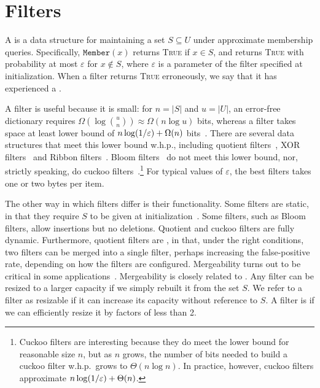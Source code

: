 
\section{Filters}

A  is a data structure for maintaining a set $S\subseteq U$ under approximate membership queries.  Specifically, $\texttt{Member}(x)$ returns \textsc{True} if $x\in S$, and returns \textsc{True} with probability at most $\varepsilon$ for $x\notin S$, where $\varepsilon$ is a parameter of the filter specified at initialization.  When a filter returns \textsc{True} erroneously, we say that it has experienced a .

A filter is useful because it is small: for $n= |S|$ and $u = |U|$, an error-free dictionary requires $\Omega(\log {u\choose n})
\approx \Omega(n \log u)$ bits, whereas a filter  takes space at least  lower bound of $n\log (1/\varepsilon) + \Omega(n)$
bits~\cite{CarterFG78}.  There are several data structures that meet this lower bound w.h.p., including quotient filters~\cite{Cleary84,PaghPaRa05,DillingerM09,BenderFaJo12a,PandeyBJP17,PandeyCDBFJ21}, XOR
filters~\cite{GrafLe20} and Ribbon filters~\cite{DillingerW21}.  Bloom filters~\cite{Bloom70} do not meet this lower bound, nor, strictly speaking, do cuckoo filters~\cite{FanAnKa14,BreslowJ18}.\footnote{Cuckoo filters are interesting because they do meet the lower bound for reasonable size $n$, but as $n$ grows, the number of bits needed to build a cuckoo filter w.h.p.\ grows to $\Theta(n\log n)$.  In practice, however, cuckoo filters approximate $n\log (1/\varepsilon) + \Theta(n)$.}
%
For typical values of $\varepsilon$, the best filters takes one or two bytes per item.

The other way in which filters differ is their functionality. Some filters are static, in that they require $S$ to be given at initialization~\cite{GrafL19,DillingerW21}.  Some filters, such as Bloom filters, allow insertions but no deletions.  Quotient and cuckoo filters are fully dynamic.  Furthermore, quotient filters are , in that, under the right conditions, two filters can be merged into a single filter, perhaps increasing the false-positive rate, depending on how the filters are configured.  Mergeability turns out to be critical in some applications~\cite{conway2020splinterdb,PandeyABFJP18Cell}. Mergeability is closely related to .  Any filter can be resized to a larger capacity if we  simply rebuilt it from the set $S$.  We refer to a filter as resizable if it can increase its capacity without reference to $S$.  A filter is  if we can efficiently resize it by factors of less than 2.    

